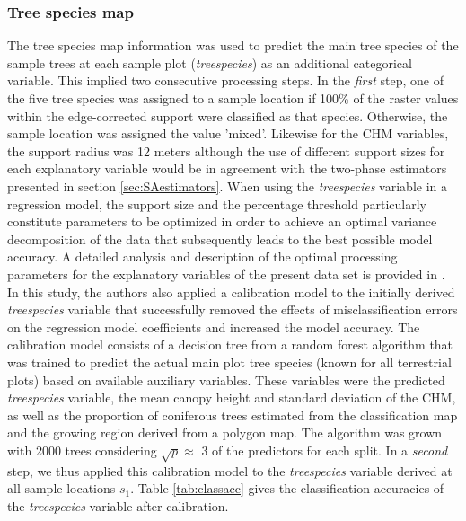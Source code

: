 \subsubsection{Tree species map}

The tree species map information was used to predict the main tree species of the sample trees at each sample plot (\textit{treespecies}) as an additional categorical variable. This implied two consecutive processing steps. In the \textit{first} step, one of the five tree species was assigned to a sample location if 100\% of the raster values within the edge-corrected support were classified as that species. Otherwise, the sample location was assigned the value 'mixed'. Likewise for the CHM variables, the support radius was 12 meters although the use of different support sizes for each explanatory variable would be in agreement with the two-phase estimators presented in section \ref{sec:SAestimators}. When using the \textit{treespecies} variable in a regression model, the support size and the percentage threshold particularly constitute parameters to be optimized in order to achieve an optimal variance decomposition of the data that subsequently leads to the best possible model accuracy. A detailed analysis and description of the optimal processing parameters for the explanatory variables of the present data set is provided in \citet{hill2017a}. In this study, the authors also applied a calibration model to the initially derived \textit{treespecies} variable that successfully removed the effects of misclassification errors on the regression model coefficients and increased the model accuracy. The calibration model consists of a decision tree from a random forest algorithm \citet{breiman2001} that was trained to predict the actual main plot tree species (known for all terrestrial plots) based on available auxiliary variables. These variables were the predicted \textit{treespecies} variable, the mean canopy height and standard deviation of the CHM, as well as the proportion of coniferous trees estimated from the classification map and the growing region derived from a polygon map. The algorithm was grown with 2000 trees considering $\sqrt{p} \approx$ 3 of the predictors for each split. In a \textit{second} step, we thus applied this calibration model to the \textit{treespecies} variable derived at all sample locations $s_1$. Table \ref{tab:classacc} gives the classification accuracies of the \textit{treespecies} variable after calibration.



